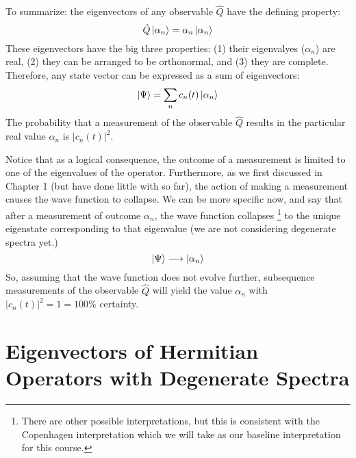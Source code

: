 \documentclass[12pt]{book}
\begin{document}
To summarize:  the eigenvectors of any observable $\hat{Q}$ have the defining property:
$$\hat{Q} \ket{\alpha_n} = \alpha_n \ket{\alpha_n}$$
These eigenvectors have the big three properties: (1) their eigenvalyes ($\alpha_n$) are real, (2) they can be arranged to be orthonormal, and (3) they are complete.  Therefore, any state vector can be expressed as a sum of eigenvectors:
$$\ket{\Psi} = \sum_n c_n(t) \ket{\alpha_n}$$
The probability that a measurement of the observable $\hat{Q}$ results in the particular real value $\alpha_n$ is $|c_n(t)|^2$. 

Notice that as a logical consequence, the outcome of a measurement is limited to one of the eigenvalues of the operator.  Furthermore, as we first discussed in Chapter 1 (but have done little with so far), the action of making a measurement causes the wave function to collapse.  We can be more specific now, and say that after a measurement of outcome $\alpha_n$, the wave function collapses
\footnote{There are other possible interpretations, but this is consistent with the Copenhagen interpretation which we will take as our baseline interpretation for this course.} to the unique eigenstate corresponding to that eigenvalue (we are not considering degenerate spectra yet.)
$$\ket{\Psi} \longrightarrow \ket{\alpha_n}$$
So, assuming that the wave function does not evolve further, subsequence measurements of the observable $\hat{Q}$ will yield the value $\alpha_n$ with $|c_n(t)|^2 = 1 = 100\%$ certainty.

\section{Eigenvectors of Hermitian Operators with Degenerate Spectra}
\end{document}
